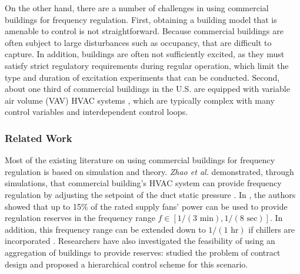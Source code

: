On the other hand, there are a number of challenges in using commercial buildings for frequency regulation. 
First, obtaining a building model that is amenable to control is not straightforward. 
Because commercial buildings are often subject to large disturbances such as occupancy, that are difficult to capture. 
In addition, buildings are often not sufficiently excited, as they must satisfy strict regulatory requirements during regular operation, which limit the type and duration of excitation experiments that can be conducted.
Second, about one third of commercial buildings in the U.S. are equipped with variable air volume (VAV) HVAC systems \cite{Hao:2012demandresponse}, which are typically complex with many control variables and interdependent control loops.


\subsubsection{Related Work}
Most of the existing literature on using commercial buildings for frequency regulation is based on simulation and theory. 
\textit{Zhao et al.} demonstrated, through simulations, that commercial building's HVAC system can provide frequency regulation by adjusting the setpoint of the duct static pressure \cite{Zhao:2013hvac}.
In \cite{Hao:2014fan}, the authors showed that %
up to 15\% of the rated supply fans' power can be used to provide regulation reserves in the frequency range $f \in [1/(3 \text{~min}), 1/(8 \text{~sec})]$. 
In addition, this frequency range can be extended down to $1/(1 \text{~hr})$ if chillers are incorporated \cite{Lin:2013chiller}.
Researchers have also investigated the feasibility of using an aggregation of buildings to provide reserves: \cite{Balandat:2014contractdesign} studied the problem of contract design and \cite{Vrettos:2014aggregation} proposed a hierarchical control scheme for this scenario.

